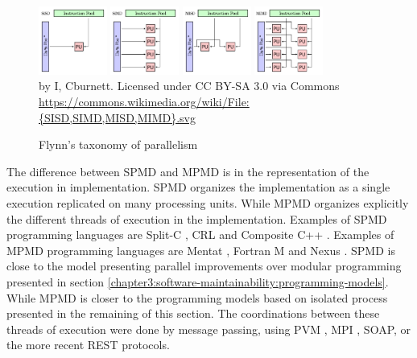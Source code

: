 \begin{figure}
\begin{center}
\includegraphics[width=0.2\textwidth]{../ressources/SISD.pdf}
\includegraphics[width=0.2\textwidth]{../ressources/SIMD.pdf}
\includegraphics[width=0.2\textwidth]{../ressources/MISD.pdf}
\includegraphics[width=0.2\textwidth]{../ressources/MIMD.pdf}\\
by I, Cburnett. Licensed under CC BY-SA 3.0 via Commons
\url{https://commons.wikimedia.org/wiki/File:{SISD,SIMD,MISD,MIMD}.svg}
\end{center}
\caption{Flynn's taxonomy of parallelism}
\end{figure}


The difference between SPMD and MPMD is in the representation of the execution in implementation.
SPMD organizes the implementation as a single execution replicated on many processing units.
While MPMD organizes explicitly the different threads of execution in the implementation.
Examples of SPMD programming languages are
Split-C \cite{Culler},
CRL \cite{Johnson1995} and
Composite C++ \cite{K.ManiChandy2005}.
%
Examples of MPMD programming languages are
Mentat \cite{Grimshaw1991},
Fortran M \cite{Foster1995b} and
Nexus \cite{Foster1996}.
SPMD is close to the model presenting parallel improvements over modular programming presented in section \ref{chapter3:software-maintainability:programming-models}.
While MPMD is closer to the programming models based on isolated process presented in the remaining of this section.
The coordinations between these threads of execution were done by message passing, using PVM \cite{Sunderam1994}, MPI \cite{Snir1996,Walker1996}, SOAP, or the more recent REST protocols.


